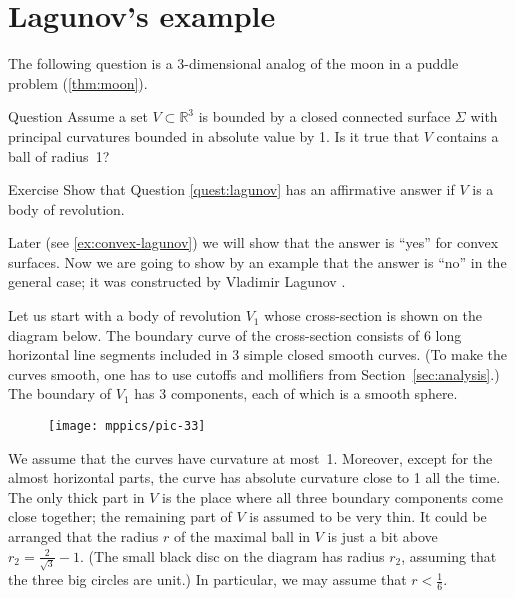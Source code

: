 
\section{Lagunov's example}

The following question is a 3-dimensional analog of the moon in a puddle problem (\ref{thm:moon}).

\begin{thm}{Question}\label{quest:lagunov}
Assume a set $V\subset \mathbb{R}^3$ is bounded by a closed connected surface $\Sigma$ with 
principal curvatures bounded in absolute value by 1.
Is it true that $V$ contains a ball of radius~1?
\end{thm}

\begin{thm}{Exercise}\label{ex:moon-revolution}
Show that Question \ref{quest:lagunov} has an affirmative answer if $V$ is a body of revolution.
\end{thm}

Later (see \ref{ex:convex-lagunov})
we will show that the answer is ``yes'' for convex surfaces.
Now we are going to show by an example that the answer is ``no'' in the general case;
it was constructed by Vladimir Lagunov \cite{lagunov-1961}.

Let us start with a body of revolution $V_1$ whose cross-section is shown on the diagram below.
The boundary curve of the cross-section consists of 6 long horizontal line segments included in 3 simple closed smooth curves.
(To make the curves smooth, one has to use cutoffs and mollifiers from Section~\ref{sec:analysis}.)
The boundary of $V_1$ has 3 components, each of which is a smooth sphere.

\begin{figure}[ht!]
\centering
\texttt{[image: mppics/pic-33]}
\vskip0mm
\end{figure}

We assume that the curves have curvature at most~1.
Moreover, except for the almost horizontal parts, the curve has absolute curvature close to 1 all the time.
The only thick part in $V$ is the place where all three boundary components come close together;
the remaining part of $V$ is assumed to be very thin.
It could be arranged that the radius $r$ of the maximal ball in $V$ is just a bit above 
$r_2=\tfrac2{\sqrt{3}}-1$.
(The small black disc on the diagram has radius $r_2$,
assuming that the three big circles are unit.)
In particular, we may assume that $r<\tfrac16$.

